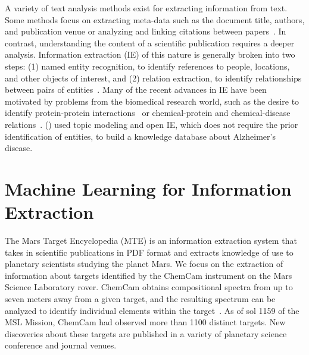 \documentclass[letterpaper]{article} %
\begin{document}
A variety of text analysis methods exist for extracting information
from text.  Some methods focus on extracting meta-data such as the
document title, authors, and publication venue or analyzing and
linking citations between papers~\cite{ronzano:scipub16}.
%
In contrast, understanding the content of a scientific publication
requires a deeper analysis.  Information extraction (IE) of this
nature is generally broken into two steps: (1) named entity
recognition, to identify references to people, locations, and other
objects of interest, and (2) relation extraction, to identify
relationships between pairs of entities~\cite{mooney:ie05}.  Many of
the recent advances in IE have been motivated by problems from the
biomedical research world, such as the desire to identify
protein-protein interactions~\cite{tikk:protein10,bui:protein11} or
chemical-protein and chemical-disease
relations~\cite{krallinger:chemistry17}.  \citeauthor{tsutsui:ad16}
(\citeyear{tsutsui:ad16}) used topic modeling and open IE, which does
not require the prior identification of entities, to build a knowledge
database about Alzheimer's disease.

%
%

\section{Machine Learning for Information Extraction}

The Mars Target Encyclopedia (MTE) is an information extraction system
that takes in scientific publications in PDF format and extracts
knowledge of use to planetary scientists studying the planet Mars.
%
We focus on the extraction of information about targets identified by
the ChemCam instrument on the Mars Science Laboratory rover.  ChemCam
obtains compositional spectra from up to seven meters away from a
given target, and the resulting spectrum can be analyzed to identify
individual elements within the target~\cite{maurice:chemcam12}.  As of
sol 1159 of the MSL Mission, ChemCam had observed more than 1100
distinct targets.  New discoveries about these targets are published
in a variety of planetary science conference and journal venues.  
\end{document}
